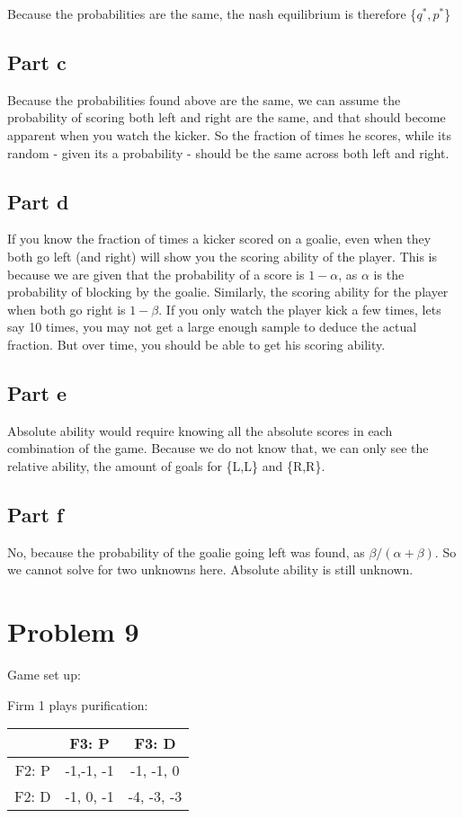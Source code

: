\documentclass{article}
\begin{document}
Because the probabilities are the same, the nash equilibrium is therefore \{$q^*, p^*$\}

\subsection{Part c}
Because the probabilities found above are the same, we can assume the probability of scoring both left and right are the same, and that should become apparent when you watch the kicker. So the fraction of times he scores, while its random - given its a probability - should be the same across both left and right. 

\subsection{Part d}
If you know the fraction of times a kicker scored on a goalie, even when they both go left (and right) will show you the scoring ability of the player. This is because we are given that the probability of a score is $1-\alpha$, as $\alpha$ is the probability of blocking by the goalie. Similarly, the scoring ability for the player when both go right is $1-\beta$. If you only watch the player kick a few times, lets say 10 times, you may not get a large enough sample to deduce the actual fraction. But over time, you should be able to get his scoring ability. 

\subsection{Part e}
Absolute ability would require knowing all the absolute scores in each combination of the game. Because we do not know that, we can only see the relative ability, the amount of goals for \{L,L\} and \{R,R\}. 

\subsection{Part f}
No, because the probability of the goalie going left was found, as $\beta/(\alpha + \beta)$. So we cannot solve for two unknowns here. Absolute ability is still unknown. 

\section{Problem 9}

Game set up:
\begin{table}[H]
\centering
Firm 1 plays purification: 
\begin{tabular}{c|c|c}
    & F3: P & F3: D \\ \hline
F2: P   & -1,-1, -1 & -1, -1, 0 \\
F2: D   & -1, 0, -1 & -4, -3, -3\\
\end{tabular}
\end{table}
\end{document}
